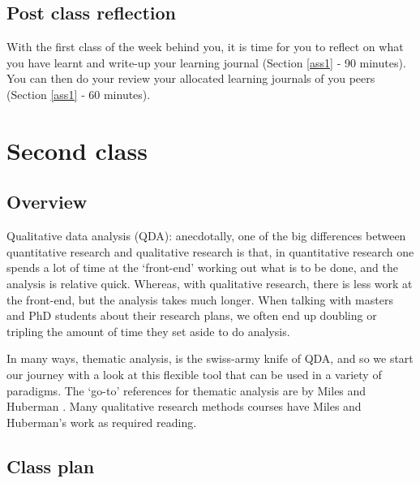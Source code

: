 \documentclass[]{book}
\theoremstyle{definition}
\theoremstyle{definition}
\theoremstyle{definition}
\theoremstyle{remark}
\begin{document}
\hypertarget{post-class-reflection-4}{%
\subsection{Post class reflection}\label{post-class-reflection-4}}

With the first class of the week behind you, it is time for you to
reflect on what you have learnt and write-up your learning journal
(Section \ref{ass1} ‐ 90 minutes). You can then do your review your
allocated learning journals of you peers (Section \ref{ass1} ‐ 60
minutes).

\hypertarget{second-class-2}{%
\section*{Second class}\label{second-class-2}}

\hypertarget{overview-5}{%
\subsection*{Overview}\label{overview-5}}

Qualitative data analysis (QDA): anecdotally, one of the big differences
between quantitative research and qualitative research is that, in
quantitative research one spends a lot of time at the `front-end'
working out what is to be done, and the analysis is relative quick.
Whereas, with qualitative research, there is less work at the front-end,
but the analysis takes much longer. When talking with masters and PhD
students about their research plans, we often end up doubling or
tripling the amount of time they set aside to do analysis.

In many ways, thematic analysis, is the swiss-army knife of QDA, and so
we start our journey with a look at this flexible tool that can be used
in a variety of paradigms. The `go-to' references for thematic analysis
are by Miles and Huberman
\autocites{miles_1994_qualitativedataanalysis}{huberman_2002_qualitativeresearchercompanion}.
Many qualitative research methods courses have Miles and Huberman's work
as required reading.

\hypertarget{class-plan-5}{%
\subsection*{Class plan}\label{class-plan-5}}
\end{document}
